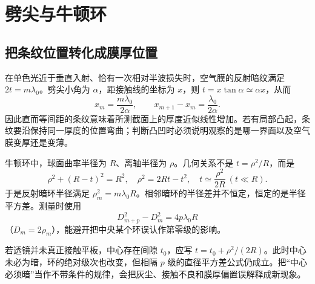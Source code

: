\section{劈尖与牛顿环}




\subsection{把条纹位置转化成膜厚位置}
在单色光近于垂直入射、恰有一次相对半波损失时，空气膜的反射暗纹满足 $2t=m\lambda_0$。劈尖小角为 $\alpha$，距接触线的坐标为 $x$，则 $t=x\tan\alpha\simeq\alpha x$，从而
\[
 x_m=\frac{m\lambda_0}{2\alpha},\qquad
 x_{m+1}-x_m=\frac{\lambda_0}{2\alpha}.
\]
因此直而等间距的条纹意味着所测截面上的厚度近似线性增加。若有局部凸起，条纹要沿保持同一厚度的位置弯曲；判断凸凹时必须说明观察的是哪一界面以及空气膜变厚还是变薄。

牛顿环中，球面曲率半径为 $R$、离轴半径为 $\rho$。几何关系不是 $t=\rho^2/R$，而是
\[
 \rho^2+(R-t)^2=R^2,
 \quad \rho^2=2Rt-t^2,
 \quad t\simeq\frac{\rho^2}{2R}\ (t\ll R).
\]
于是反射暗环半径满足 $\rho_m^2=m\lambda_0R$。相邻暗环的半径差并不恒定，恒定的是半径平方差。测量时使用
\[
 D_{m+p}^2-D_m^2=4p\lambda_0R
\]
（$D_m=2\rho_m$），能避开把中央某个环误认作第零级的影响。

若透镜并未真正接触平板，中心存在间隙 $t_0$，应写 $t=t_0+\rho^2/(2R)$。此时中心未必为暗，环的绝对级次也改变，但相隔 $p$ 级的直径平方差公式仍成立。把“中心必须暗”当作不带条件的规律，会把灰尘、接触不良和膜厚偏置误解释成新现象。

